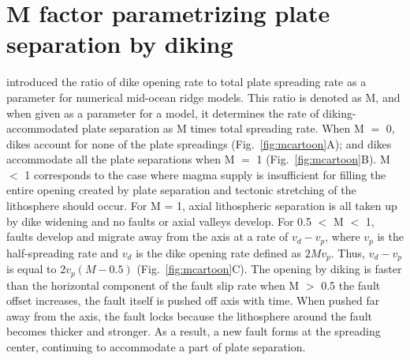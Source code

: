 \documentclass[letterpaper,12pt,notitle]{memphisthesis}                     %
\begin{document}
\section{M factor parametrizing plate separation by diking}
\citet{Buck2005} introduced the ratio of dike opening rate to total plate spreading rate as a parameter for numerical mid-ocean ridge models. This ratio is denoted as M, and when given as a parameter for a model, it determines the rate of diking-accommodated plate separation as M times total spreading rate. When M $=$ 0, dikes account for none of the plate spreadings (Fig.~\ref{fig:mcartoon}A); and dikes accommodate all the plate separations when M $=$ 1 (Fig.~\ref{fig:mcartoon}B). M $<$ 1 corresponds to the case where magma supply is insufficient for filling the entire opening created by plate separation and tectonic stretching of the lithosphere should occur. For M = 1, axial lithospheric separation is all taken up by dike widening and no faults or axial valleys develop. For 0.5 $<$ M $<$ 1, faults develop and migrate away from the axis at a rate of $v_d-v_p$, where $v_{p}$ is the half-spreading rate and $v_{d}$ is the dike opening rate defined as $2Mv_{p}$. Thus, $v_{d}-v_{p}$ is equal to $2 v_p (M - 0.5)$ (Fig.~\ref{fig:mcartoon}C). 
The opening by diking is faster than the horizontal component of the fault slip rate when M $>$ 0.5 the fault offset increases, the fault itself is pushed off axis with time. When pushed far away from the axis, the fault locks because the lithosphere around the fault becomes thicker and stronger. As a result, a new fault forms at the spreading center, continuing to accommodate a part of plate separation. 
\end{document}
